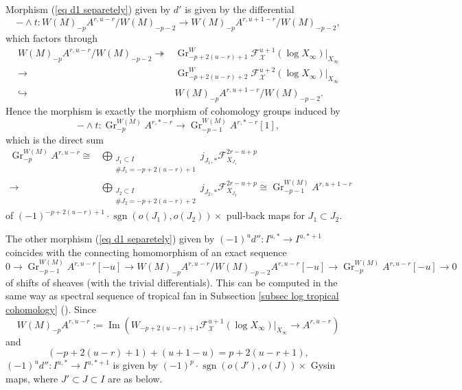 \documentclass[12pt,a4]{amsart}
\def\F{\mathscr{F}}
\def\X{\mathscr{X}}
\def\sgn{\mathop{\mathrm{sgn}}\nolimits}
\def\Gr{\mathop{\mathrm{Gr}}\nolimits}
\def\Im{\mathop{\mathrm{Im}}\nolimits}
\def\Gr{\mathop{\mathrm{Gr}}\nolimits}
\numberwithin{equation}{section}
\numberwithin{figure}{section}
\begin{document}
    Morphism (\ref{eq d1 separetely}) 
    given by $d'$
    is given by the differential  
   $$ -  \wedge t \colon   W(M)_{-p} A^{r,u-r} / W(M)_{-p-2}  
     \to    W(M)_{-p} A^{r,u+1-r} / W(M)_{-p-2} , $$
   which factors through 
   \begin{align*}
      W(M)_{-p} A^{r,u-r} / W(M)_{-p-2}  
       \twoheadrightarrow &
      \Gr^W_{-p+2(u-r)+1}  \F_{\X}^{u+1} (\log X_{\infty}) 
       |_{X_{\infty}}  \\
       \to &
      \Gr^W_{-p+2(u-r)+2}  \F_{\X}^{u+2} (\log X_{\infty}) 
       |_{X_{\infty}}  \\
       \hookrightarrow &
      W(M)_{-p} A^{r,u+1-r} / W(M)_{-p-2} 
       .
   \end{align*}
   Hence the morphism is exactly 
     the morphism of cohomology groups
    induced by 
     $$- \wedge t \colon
      \Gr^{W(M)}_{-p} A^{r,*-r} 
       \to \Gr^{W(M)}_{-p-1} A^{r,*-r} [1], $$
    which is the direct sum 
    \begin{align*}
      \Gr^{W(M)}_{-p} A^{r,u-r} 
      \cong  &
      \bigoplus_{\substack{ J_1 \subset I 
               \\ \# J_1 = -p + 2(u-r)+1 } }
        j_{J_1,*} \F_{X_{J_1}}^{2r-u+p}   
        \\
      \to &
      \bigoplus_{\substack{ J_2 \subset I 
              \\ \# J_2 = -p + 2(u-r)+2 } }
        j_{J_2,*} \F_{X_{J_2}}^{2r-u+p}  
       \cong  \Gr^{W(M)}_{-p-1} A^{r,u+1-r}
    \end{align*}
     of  $(-1)^{-p+2(u-r)+1} \cdot \sgn ( o(J_1), o(J_2) )  \times $
       pull-back maps
     for $J_1 \subset J_2 $.

  The other morphism (\ref{eq d1 separetely})
    given by $(-1)^u d'' \colon I^{u,*} \to I^{u,*+1}$
   coincides with 
    the connecting homomorphism of an exact sequence 
   $$ 0 \to 
     \Gr^{W(M)}_{-p-1} A^{r,u-r} [-u] 
     \to 
      W(M)_{-p} A^{r,u-r} / W(M)_{-p-2} A^{r,u-r} [-u]
     \to 
      \Gr^{W(M)}_{-p} A^{r,u-r} [-u]
      \to 0 $$
   of shifts of sheaves (with the trivial differentials).
   This can be computed in the same way as spectral sequence of tropical fan in Subsection \ref{subsec log tropical cohomology}
    (). 
    Since 
  $$ W(M)_{-p} A^{r,u-r} 
  := \Im (W_{-p+2(u-r) +1}\F^{u+1}_{\X } (\log X_{\infty} ) |_{ X_{\infty}  }  \to A^{r,u-r}) $$
  and 
    $$(-p + 2(u-r) +1) + (u+1-u) =p +2 (u-r+1) ,$$
   $(-1)^u d'' \colon I^{u,*} \to I^{u,*+1}$ is given by  $  (-1)^{p} \cdot \sgn (o(J'), o(J)) \times $ Gysin maps, 
   where $J' \subset J \subset I$  are as below.
\end{document}
